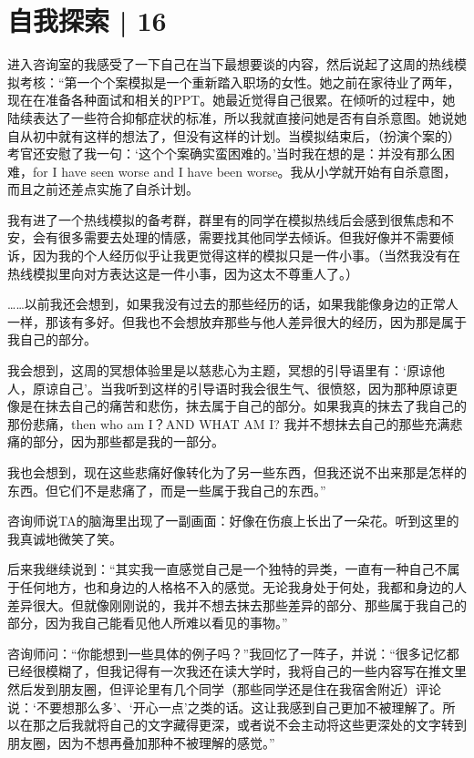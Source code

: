 \chapter{自我探索 | 16}



进入咨询室的我感受了一下自己在当下最想要谈的内容，然后说起了这周的热线模拟考核：“第一个个案模拟是一个重新踏入职场的女性。她之前在家待业了两年，现在在准备各种面试和相关的PPT。她最近觉得自己很累。在倾听的过程中，她陆续表达了一些符合抑郁症状的标准，所以我就直接问她是否有自杀意图。她说她自从初中就有这样的想法了，但没有这样的计划。当模拟结束后，（扮演个案的）考官还安慰了我一句：‘这个个案确实蛮困难的。’当时我在想的是：并没有那么困难，for I have seen worse and I have been worse。我从小学就开始有自杀意图，而且之前还差点实施了自杀计划。

我有进了一个热线模拟的备考群，群里有的同学在模拟热线后会感到很焦虑和不安，会有很多需要去处理的情感，需要找其他同学去倾诉。但我好像并不需要倾诉，因为我的个人经历似乎让我更觉得这样的模拟只是一件小事。（当然我没有在热线模拟里向对方表达这是一件小事，因为这太不尊重人了。）

……以前我还会想到，如果我没有过去的那些经历的话，如果我能像身边的正常人一样，那该有多好。但我也不会想放弃那些与他人差异很大的经历，因为那是属于我自己的部分。

我会想到，这周的冥想体验里是以慈悲心为主题，冥想的引导语里有：‘原谅他人，原谅自己’。当我听到这样的引导语时我会很生气、很愤怒，因为那种原谅更像是在抹去自己的痛苦和悲伤，抹去属于自己的部分。如果我真的抹去了我自己的那份悲痛，then who am I？AND WHAT AM I? 我并不想抹去自己的那些充满悲痛的部分，因为那些都是我的一部分。

我也会想到，现在这些悲痛好像转化为了另一些东西，但我还说不出来那是怎样的东西。但它们不是悲痛了，而是一些属于我自己的东西。”

咨询师说TA的脑海里出现了一副画面：好像在伤痕上长出了一朵花。听到这里的我真诚地微笑了笑。

\tristarsepline

后来我继续说到：“其实我一直感觉自己是一个独特的异类，一直有一种自己不属于任何地方，也和身边的人格格不入的感觉。无论我身处于何处，我都和身边的人差异很大。但就像刚刚说的，我并不想去抹去那些差异的部分、那些属于我自己的部分，因为我自己能看见他人所难以看见的事物。”

咨询师问：“你能想到一些具体的例子吗？”我回忆了一阵子，并说：“很多记忆都已经很模糊了，但我记得有一次我还在读大学时，我将自己的一些内容写在推文里然后发到朋友圈，但评论里有几个同学（那些同学还是住在我宿舍附近）评论说：‘不要想那么多’、‘开心一点’之类的话。这让我感到自己更加不被理解了。所以在那之后我就将自己的文字藏得更深，或者说不会主动将这些更深处的文字转到朋友圈，因为不想再叠加那种不被理解的感觉。”

